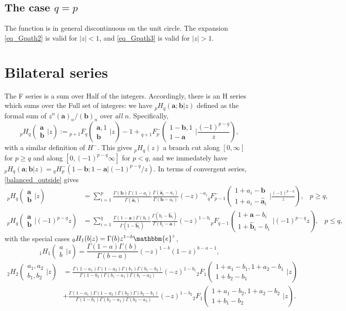 \documentclass[12pt]{article}
\newcommand{\ee}[0] {\mathbbm{e}}
\numberwithin{equation}{section}
\newcommand{\Head}[3] {{}_{#1}{#2}_{#3}}
\newcommand{\Arg}[3] {\left( \begin{array}{c} #1 \\ #2 \end{array} \Big| {#3}  \right)}
\newcommand{\FF}[6] {{}_{#1}{#2}_{#3} \left( \begin{array}{c} #4 \\ #5 \end{array} \Big| {#6}  \right)}
\newcommand{\FFe}[7] {{}_{#1}^{\,}{#2}_{#3}^{#4} \left( \begin{array}{c} #5 \\ #6 \end{array} \Big| {#7} \right)}
\newcommand{\bfa}[0] {\mathbf{a}}
\newcommand{\bfb}[0] {\mathbf{b}}
\begin{document}
\subsection{The case $q=p$}
The function is in general discontinuous on the unit circle. The expansion \eqref{eq_Gpath2} is valid for $|z| < 1$, and \eqref{eq_Gpath3} is valid for $|z| > 1$.



\section{Bilateral series}
\label{section_bilateral}
The F series is a sum over Half of the integers. Accordingly, there is an H series which sums over the Full set of integers: we have ${}_p H_q(\bfa; \bfb|z)$ defined as the formal sum of $z^n (\bfa)_n/(\bfb)_n$ over \emph{all} $n$. Specifically,
\begin{equation*}
\FF{p}{H}{q}{\bfa}{\bfb}{z} := \FF{p+1}{F}{q}{\bfa,1}{\bfb}{z}-1 + \FFe{q+1}{F}{p}{-}{1-\bfb,1}{1-\bfa}{\frac{(-1)^{p-q}}{z}} \text{,}
\end{equation*}
with a similar definition of $H^{-}$. This gives ${}_p H_q(z)$ a branch cut along $[0,\infty]$ for $p\ge q$ and along $[0,(-1)^{p-q} \infty]$ for $p < q$, and we immedately have ${}_p H_q (\bfa; \bfb | z) = {}_q H_p^{-} (1-\bfb; 1-\bfa | (-1)^{p-q}/z)$. In terms of convergent series, \eqref{balanced_outside} gives
\begin{align*}
\FF{p}{H}{q}{\bfa}{\bfb}{z} &= \sum_{i=1}^p \frac{\Gamma(\bfb)\Gamma(1-a_i)}{\Gamma(\hat{\bfa}_i)}\frac{\Gamma(\hat{\bfa}_i-a_i)}{\Gamma(\bfb-a_i)} (-z)^{-a_i} \FFe{q}{F}{p-1}{-}{1+a_i-\bfb}{1+a_i-\hat{\bfa}_i}{\frac{(-1)^{p-q}}{z}}\text{,} \quad p \ge q \text{,}\\
\FF{p}{H}{q}{\bfa}{\bfb}{(-1)^{p-q}z} &= \sum_{i=1}^q \frac{\Gamma(1-\bfa)\Gamma(b_i)}{\Gamma(1-\hat{\bfb}_i)}\frac{\Gamma(b_i-\hat{\bfb}_i)}{\Gamma(b_i-\bfa)} (-z)^{1-b_i} \FF{p}{F}{q-1}{1+\bfa-b_i}{1+\hat{\bfb}_i-b_i}{(-1)^{p-q}z}\text{,} \quad p \le q \text{,}
\end{align*}
with the special cases ${}_0 H_1(b|z) = \Gamma(b) z^{1-b} \ee^{z}$,
 \begin{equation}
\label{equ_1H1}
\Head{1}{H}{1} \Arg{a}{b}{z} = \frac{\Gamma(1-a)\Gamma(b)}{\Gamma(b-a)} (-z)^{1-b}(1-z)^{b-a-1}\text{,}
\end{equation}
\begin{equation}
\label{equ_2H2}
\begin{aligned}
\FF{2}{H}{2}{a_1,a_2}{b_1,b_2}{z} &= \frac{\Gamma(1-a_1)\Gamma(1-a_2)\Gamma(b_1)\Gamma(b_1-b_2)}{\Gamma(1-b_2)\Gamma(b_1-a_1)\Gamma(b_1-a_2)} (-z)^{1-b_1} \FF{2}{F}{1}{1+a_1-b_1,1+a_2-b_1}{1+b_2-b_1}{z}\\
&+ \frac{\Gamma(1-a_1)\Gamma(1-a_2)\Gamma(b_2)\Gamma(b_2-b_1)}{\Gamma(1-b_1)\Gamma(b_2-a_1)\Gamma(b_2-a_2)} (-z)^{1-b_2} \FF{2}{F}{1}{1+a_1-b_2,1+a_2-b_2}{1+b_1-b_2}{z}\text{.}
\end{aligned}
\end{equation}
\end{document}
